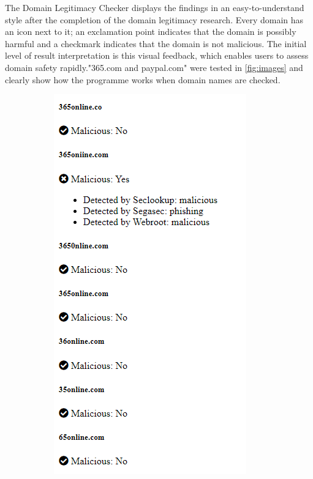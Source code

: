 The Domain Legitimacy Checker displays the findings in an easy-to-understand style after the completion of the domain legitimacy research. Every domain has an icon next to it; an exclamation point indicates that the domain is possibly harmful and a checkmark indicates that the domain is not malicious. The initial level of result interpretation is this visual feedback, which enables users to assess domain safety rapidly."365.com and paypal.com" were tested in \ref{fig:images} and clearly show how the programme works when domain names are checked. 

\begin{figure}[H]
  \centering
  \begin{subfigure}[b]{0.25\textwidth}
    \includegraphics[width=\textwidth]{project/2222.png}

\end{subfigure}
\end{figure}
